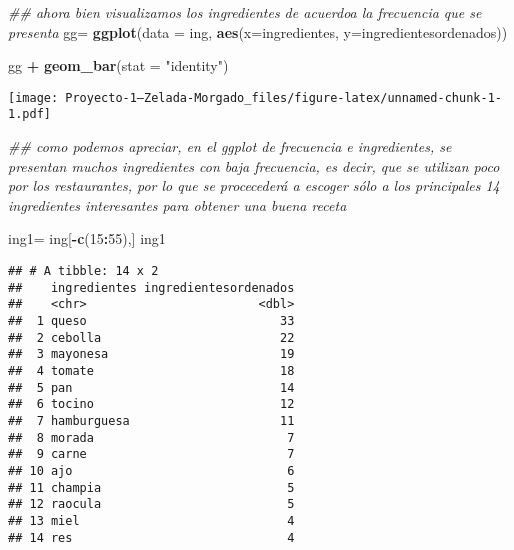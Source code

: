 \documentclass[
]{article}
\newenvironment{Shaded}{\begin{snugshade}}{\end{snugshade}}
\newcommand{\CommentTok}[1]{\textcolor[rgb]{0.56,0.35,0.01}{\textit{#1}}}
\newcommand{\DataTypeTok}[1]{\textcolor[rgb]{0.13,0.29,0.53}{#1}}
\newcommand{\DecValTok}[1]{\textcolor[rgb]{0.00,0.00,0.81}{#1}}
\newcommand{\KeywordTok}[1]{\textcolor[rgb]{0.13,0.29,0.53}{\textbf{#1}}}
\newcommand{\NormalTok}[1]{#1}
\newcommand{\OperatorTok}[1]{\textcolor[rgb]{0.81,0.36,0.00}{\textbf{#1}}}
\newcommand{\StringTok}[1]{\textcolor[rgb]{0.31,0.60,0.02}{#1}}
\begin{document}
\begin{Shaded}
\begin{Highlighting}[]
\CommentTok{## ahora bien visualizamos los ingredientes de acuerdoa  la frecuencia que se presenta}
\NormalTok{gg=}\StringTok{ }\KeywordTok{ggplot}\NormalTok{(}\DataTypeTok{data =}\NormalTok{ ing, }\KeywordTok{aes}\NormalTok{(}\DataTypeTok{x=}\NormalTok{ingredientes, }\DataTypeTok{y=}\NormalTok{ingredientesordenados))}

\NormalTok{gg }\OperatorTok{+}\StringTok{ }\KeywordTok{geom_bar}\NormalTok{(}\DataTypeTok{stat =} \StringTok{"identity"}\NormalTok{)}
\end{Highlighting}
\end{Shaded}

\texttt{[image: Proyecto-1--Zelada-Morgado\_files/figure-latex/unnamed-chunk-1-1.pdf]}

\begin{Shaded}
\begin{Highlighting}[]
\CommentTok{## como podemos apreciar, en el ggplot de frecuencia e ingredientes, se presentan muchos ingredientes con baja frecuencia, es decir, que se utilizan poco por los restaurantes, por lo que se procecederá a escoger sólo a los principales 14 ingredientes interesantes para obtener una buena receta}

\NormalTok{ing1=}\StringTok{ }\NormalTok{ing[}\OperatorTok{-}\KeywordTok{c}\NormalTok{(}\DecValTok{15}\OperatorTok{:}\DecValTok{55}\NormalTok{),]}
\NormalTok{ing1}
\end{Highlighting}
\end{Shaded}

\begin{verbatim}
## # A tibble: 14 x 2
##    ingredientes ingredientesordenados
##    <chr>                        <dbl>
##  1 queso                           33
##  2 cebolla                         22
##  3 mayonesa                        19
##  4 tomate                          18
##  5 pan                             14
##  6 tocino                          12
##  7 hamburguesa                     11
##  8 morada                           7
##  9 carne                            7
## 10 ajo                              6
## 11 champia                          5
## 12 raocula                          5
## 13 miel                             4
## 14 res                              4
\end{verbatim}
\end{document}
